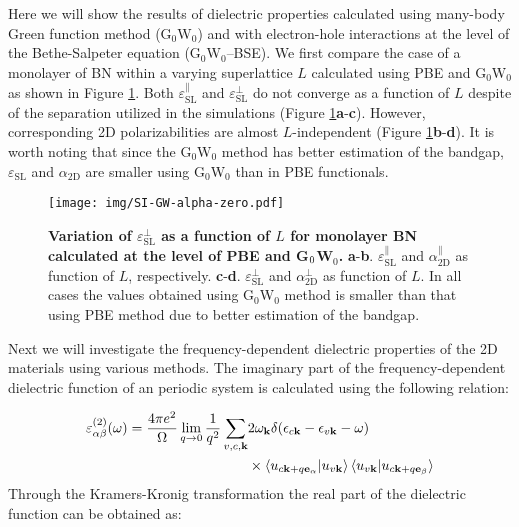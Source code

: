 \documentclass[manuscript=suppinfo,email=true,hyperref=true,keywords=false]{achemso}
\begin{document}
Here we will show the results of dielectric properties calculated
using many-body Green function method (G$_0$W$_{0}$)
and with electron-hole interactions at the level of the Bethe-Salpeter 
equation (G$_0$W$_{0}$--BSE). We first compare the case of a
monolayer of BN within a varying superlattice $L$ 
calculated using PBE and G$_{0}$W$_{0}$ as shown in Figure \ref{fig:GW-PBE-alpha}. 
%
%
Both $\varepsilon_{\mathrm{SL}}^{\parallel}$ and
$\varepsilon_{\mathrm{SL}}^{\perp}$ do not converge as a function of $L$ 
despite of the separation utilized in the simulations (Figure \ref{fig:GW-PBE-alpha}{\bf a}-{\bf c}). However, corresponding 2D polarizabilities are almost $L$-independent (Figure \ref{fig:GW-PBE-alpha}{\bf b}-{\bf d}). It is worth noting
that since the G$_{0}$W$_{0}$ method has better estimation of the bandgap, $\varepsilon_{\mathrm{SL}}$ and $\alpha_{\mathrm{2D}}$ are smaller using G$_{0}$W$_{0}$ than in PBE functionals.
\begin{figure}[htbp]
  \centering
 \texttt{[image: img/SI-GW-alpha-zero.pdf]}
 \caption{{\bf Variation of 
   $\varepsilon^{\perp}_{\mathrm{SL}}$ as a function of $L$ for
   monolayer BN calculated at the level of PBE and G$_{\rm 0}$W$_{0}$.}
   \textbf{a}-{\bf b}. $\varepsilon_{\mathrm{SL}}^{\parallel}$ and $\alpha_{\mathrm{2D}}^{\parallel}$ as function of $L$, respectively.    
  \textbf{c}-{\bf d}. $\varepsilon_{\mathrm{SL}}^{\perp}$ and 
  $\alpha_{\mathrm{2D}}^{\perp}$ as
   function of $L$. 
   In all cases the values obtained using
   G$_{0}$W$_{0}$ method is smaller than that using PBE method due to
   better estimation of the bandgap.}
  \label{fig:GW-PBE-alpha}
\end{figure}

Next we will investigate the frequency-dependent dielectric properties of the 2D materials using various methods. The imaginary part of the frequency-dependent dielectric function of an periodic system is calculated using the following relation:

\begin{equation}
\begin{aligned}
  \label{eq:dft-dielectric}
\varepsilon_{\alpha\beta}^{(2)}(\omega)=\frac{4\pi e^2}{\Omega}\lim\limits_{q\rightarrow 0}\frac{1}{q^2}\sum_{v,c,\mathbf{k}}&2\omega_\mathbf{k}\delta(\epsilon_{c\mathbf{k}}-\epsilon_{v\mathbf{k}}-\omega) \\
&\times\braket{u_{c\mathbf{k}+q\mathbf{e}_\alpha}|u_{v\mathbf{k}}}\braket{u_{v\mathbf{k}}|u_{c\mathbf{k}+q\mathbf{e}_\beta}}
\end{aligned}
\end{equation}
Through the Kramers-Kronig transformation the real part of the dielectric function can be obtained as: 
\end{document}
